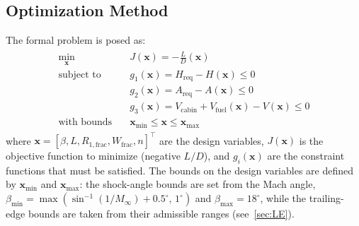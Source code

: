 \documentclass[10pt,a4paper]{article}
\begin{document}
\subsection{Optimization Method}
The formal problem is posed as:
\begin{gather}
    \begin{aligned}
        \min_{\mathbf{x}} \quad & J(\mathbf{x}) = -\frac{L}{D}(\mathbf{x}) \\
        \text{subject to} \quad & g_1(\mathbf{x}) = H_{\text{req}} - H(\mathbf{x}) \le 0 \\
        & g_2(\mathbf{x}) = A_{\text{req}} - A(\mathbf{x}) \le 0 \\
        & g_3(\mathbf{x}) = V_{\text{cabin}} + V_{\text{fuel}}(\mathbf{x}) - V(\mathbf{x}) \le 0 \\
        \text{with bounds} \quad & \mathbf{x}_\text{min} \le \mathbf{x} \le \mathbf{x}_\text{max}
    \end{aligned}
\end{gather}
where $\mathbf{x} = {[\beta, L, R_{1,\text{frac}}, W_{\text{frac}}, n]}^\top$ are the design variables, $J(\mathbf{x})$ is the objective function to minimize (negative $L/D$), and $g_i(\mathbf{x})$ are the constraint functions that must be satisfied. The bounds on the design variables are defined by $\mathbf{x}_\text{min}$ and $\mathbf{x}_\text{max}$: the shock-angle bounds are set from the Mach angle,\ $\beta_{\min} = \max\left(\sin^{-1}(1/M_\infty) + 0.5^{\circ},\,1^{\circ}\right)$ and $\beta_{\max} = 18^{\circ}$, while the trailing-edge bounds are taken from their admissible ranges (see~\cref{sec:LE}).
\end{document}
